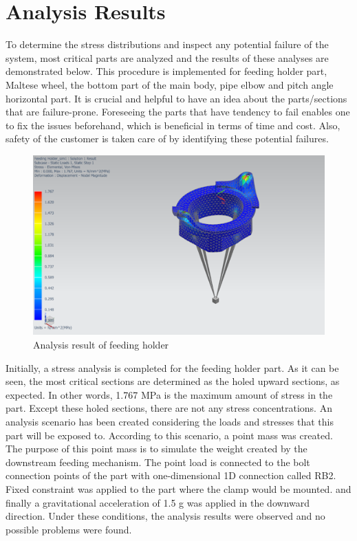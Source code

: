 \documentclass[12pt]{report}
\begin{document}
\section{Analysis Results}

To determine the stress distributions and inspect any potential failure of the system, most critical parts are analyzed and the results of these analyses are demonstrated below. This procedure is implemented for feeding holder part, Maltese wheel, the bottom part of the main body, pipe elbow and pitch angle horizontal part. It is crucial and helpful to have an idea about the parts/sections that are failure-prone. Foreseeing the parts that have tendency to fail enables one to fix the issues beforehand, which is beneficial in terms of time and cost. Also, safety of the customer is taken care of by identifying these potential failures.


\begin{figure}[H]
    \centering
    \includegraphics[width=0.65\linewidth]{feedingholderfinal.png}
    \caption{Analysis result of feeding holder}
    \label{fig:feedingholderanalysis}
\end{figure}

Initially, a stress analysis is completed for the feeding holder part. As it can be seen, the most critical sections are determined as the holed upward sections, as expected. In other words, 1.767 MPa is the maximum amount of stress in the part. Except these holed sections, there are not any stress concentrations. 
An analysis scenario has been created considering the loads and stresses that this part will be exposed to. According to this scenario, a point mass was created.  The purpose of this point mass is to simulate the weight created by the downstream feeding mechanism. The point load is connected to the bolt connection points of the part with one-dimensional 1D connection called RB2. Fixed constraint was applied to the part where the clamp would be mounted. and finally a gravitational acceleration of 1.5 g was applied in the downward direction. Under these conditions, the analysis results were observed and no possible problems were found.
\end{document}
